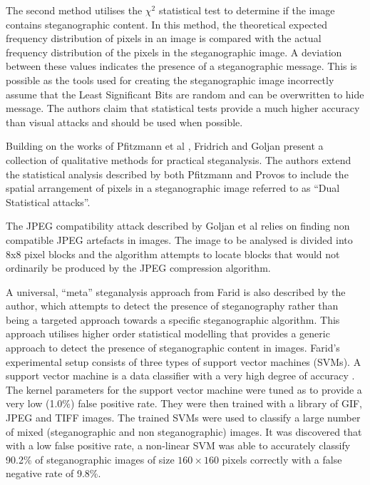 \par The second method utilises the $\chi^{2}$ statistical test to determine if the image contains steganographic content. In this method,  the theoretical expected frequency distribution of pixels in an image is compared with the actual frequency distribution of the pixels in the steganographic image. A deviation between these values indicates the presence of a steganographic message. This is possible as the tools used for creating the steganographic image incorrectly assume that the Least Significant Bits are random and can be overwritten to hide message. The authors claim that statistical tests provide a much higher accuracy than visual attacks and should be used when possible. 
\par Building on the works of Pfitzmann et al  \cite{westfeld2000attacks}, Fridrich and Goljan \cite{fridrich2002practical} present a collection of qualitative methods for practical steganalysis. The authors extend the statistical analysis described by both Pfitzmann and Provos to include the spatial arrangement of pixels in a steganographic image referred to as ``Dual Statistical attacks''.  
\par The JPEG compatibility attack described by Goljan et al relies on finding non compatible JPEG artefacts in images. The image to be analysed is divided into  8x8 pixel blocks and the algorithm attempts to locate blocks that would not ordinarily be produced by the JPEG compression algorithm.
\par A universal, ``meta'' steganalysis approach from Farid  \cite{farid2002detecting} is also described by the author, which attempts to detect the presence of steganography rather than being a targeted approach towards a specific steganographic algorithm.  This approach utilises higher order statistical modelling that provides a generic approach to detect the presence of steganographic content in images. Farid's experimental setup consists of three types of support vector machines (SVMs). A support vector machine is a data classifier with a very high degree of accuracy \cite{noble2006support}. The kernel parameters for the support vector machine were tuned as to provide a very low (1.0\%) false positive rate. They were then trained with a library of GIF, JPEG and TIFF images. The trained SVMs were used to classify a large number of mixed (steganographic and non steganographic) images. It was discovered that with a low false positive rate, a non-linear SVM was able to accurately classify 90.2\% of steganographic images of size $160\times160$ pixels correctly with a false negative rate of 9.8\%.
